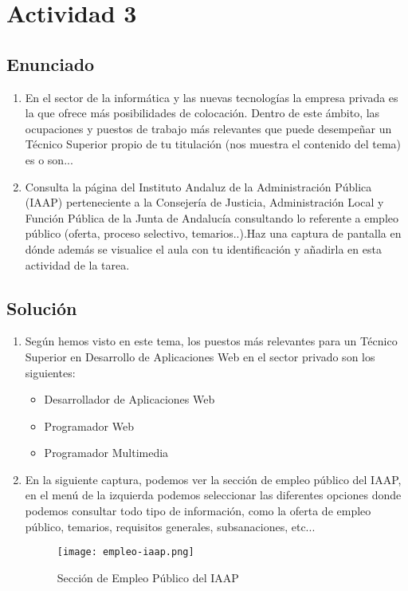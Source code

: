 \section{Actividad 3}
\subsection{Enunciado}

\begin{enumerate}[label=(\alph*)]
    \item En el sector de la informática y las nuevas tecnologías la empresa privada es la que ofrece más posibilidades de colocación. Dentro de este ámbito, las ocupaciones y puestos de trabajo más relevantes que puede desempeñar un Técnico Superior propio de tu titulación (nos muestra el contenido del tema) es o son...

    \item Consulta la página del Instituto Andaluz de la Administración Pública (IAAP) perteneciente a la Consejería de Justicia, Administración Local y Función Pública de la Junta de Andalucía consultando lo referente a empleo público (oferta, proceso selectivo, temarios..).Haz una captura de pantalla en dónde además se visualice el aula con tu identificación y añadirla en esta actividad de la tarea.
\end{enumerate}

\subsection{Solución}

\begin{enumerate}[label=(\alph*)]
    \item Según hemos visto en este tema, los puestos más relevantes para un Técnico Superior en Desarrollo de Aplicaciones Web en el sector privado son los siguientes:
    \begin{itemize}
        \item Desarrollador de Aplicaciones Web
        \item Programador Web
        \item Programador Multimedia
    \end{itemize}

    \item En la siguiente captura, podemos ver la sección de empleo público del IAAP, en el menú de la izquierda podemos seleccionar las diferentes opciones donde podemos consultar todo tipo de información, como la oferta de empleo público, temarios, requisitos generales, subsanaciones, etc...

    \begin{figure}[ht]
        \centering
        \texttt{[image: empleo-iaap.png]}
        \caption{Sección de Empleo Público del IAAP}
    \end{figure}
\end{enumerate}

